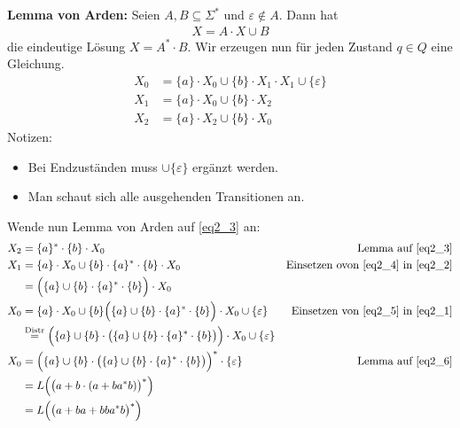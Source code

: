 \documentclass[12pt,a4paper]{article}
\begin{document}
\begin{lösung}
	\textbf{Lemma von Arden:}
	Seien $A,B\subseteq\Sigma^\ast$ und $\varepsilon\not\in A$.
	Dann hat
	\begin{align}\label{eqLemmaArden}\tag{Arden}
		X=A\cdot X\cup B
	\end{align}
	die eindeutige Lösung $X=A^\ast\cdot B$.\nl
	Wir erzeugen nun für jeden Zustand $q\in Q$ eine Gleichung.
	\begin{align}\label{eq2_1}
		X_0&=\lbrace a\rbrace\cdot X_0\cup\lbrace b\rbrace\cdot X_1\cdot X_1\cup\lbrace\varepsilon\rbrace\\\label{eq2_2}
		X_1&=\lbrace a\rbrace\cdot X_0\cup\lbrace b\rbrace\cdot X_2\\
		X_2&=\lbrace a\rbrace\cdot X_2\cup\lbrace b\rbrace\cdot X_0\label{eq2_3}
	\end{align}
	Notizen:
	\begin{itemize}
		\item Bei Endzuständen muss $\cup\lbrace\varepsilon\rbrace$ ergänzt werden.
		\item Man schaut sich alle ausgehenden Transitionen an.
	\end{itemize}
	Wende nun Lemma von Arden auf \eqref{eq2_3} an:
	\begin{align}\label{eq2_4}
		X_2&=\lbrace a\rbrace^\ast\cdot\lbrace b\rbrace\cdot X_0 &\text{Lemma auf \eqref{eq2_3}}\\\nonumber
		X_1&=\lbrace a\rbrace\cdot X_0\cup\lbrace b\rbrace\cdot\lbrace a\rbrace^\ast\cdot\lbrace b\rbrace\cdot X_0 &\text{Einsetzen ovon \eqref{eq2_4} in \eqref{eq2_2}}\\
		&=\Big(\lbrace a\rbrace\cup\lbrace b\rbrace\cdot\lbrace a\rbrace^\ast\cdot\lbrace b\rbrace\Big)\cdot X_0\label{eq2_5}\\
		X_0&=\lbrace a\rbrace\cdot X_0\cup\lbrace b\rbrace\Big(\lbrace a\rbrace\cup\lbrace b\rbrace\cdot\lbrace a\rbrace^\ast\cdot\lbrace b\rbrace\Big)\cdot X_0\cup\lbrace\varepsilon\rbrace &\text{Einsetzen von \eqref{eq2_5} in \eqref{eq2_1}}\nonumber\\
		&\overset{\text{Distr}}{=}
		\Big(\lbrace a\rbrace\cup\lbrace b\rbrace\cdot\big(\lbrace a\rbrace\cup\lbrace b\rbrace\cdot\lbrace a\rbrace^\ast\cdot\lbrace b\rbrace\big)\Big)\cdot X_0\cup\lbrace\varepsilon\rbrace\label{eq2_6}\\
		X_0&=\Big(\lbrace a\rbrace\cup\lbrace b\rbrace\cdot\big(\lbrace a\rbrace\cup\lbrace b\rbrace\cdot\lbrace a\rbrace^\ast\cdot\lbrace b\rbrace\big)\Big)^\ast\cdot\lbrace\varepsilon\rbrace &\text{Lemma auf \eqref{eq2_6}}\nonumber\\
		&=L\Big(\big(a+b\cdot(a+ba^\ast b)\big)^\ast\Big)\nonumber\\
		&=L\Big(\big(a+ba+bba^\ast b\big)^\ast\Big)\nonumber
	\end{align}
\end{lösung} 
\end{document}
